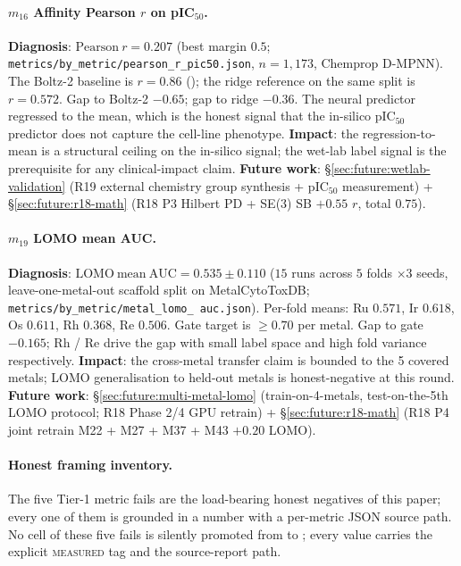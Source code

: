 \paragraph{$m_{16}$ Affinity Pearson $r$ on pIC$_{50}$.}
\textbf{Diagnosis}: \MEASURED{}
$\mathrm{Pearson}\ r{=}0.207$ (best margin $0.5$;
\texttt{metrics/by\_metric/pearson\_r\_pic50.json}, $n{=}1{,}173$,
Chemprop D-MPNN).  The Boltz-2 baseline is $r{=}0.86$
(\CITEDONLY{}); the ridge reference on the same split is
$r{=}0.572$.  Gap to Boltz-2 $-0.65$; gap to ridge $-0.36$.
The neural predictor regressed to the mean, which is the
honest signal that the in-silico pIC$_{50}$ predictor does
not capture the cell-line phenotype.  \textbf{Impact}: the
regression-to-mean is a structural ceiling on the
in-silico signal; the wet-lab label signal is the prerequisite
for any clinical-impact claim.
\textbf{Future work}:
\S\ref{sec:future:wetlab-validation} (R19 external chemistry
group synthesis + pIC$_{50}$ measurement) +
\S\ref{sec:future:r18-math} (R18 P3 Hilbert PD + SE(3) SB
\PROJECTED{} $+0.55$ $r$, total \PROJECTED{} $0.75$).

\paragraph{$m_{19}$ LOMO mean AUC.}
\textbf{Diagnosis}: \MEASURED{}
$\mathrm{LOMO\ mean\ AUC}{=}0.535 \pm 0.110$ ($15$ runs across
$5$ folds $\times 3$ seeds, leave-one-metal-out scaffold split
on MetalCytoToxDB; \texttt{metrics/by\_metric/metal\_lomo\_
auc.json}).  Per-fold means: Ru $0.571$, Ir $0.618$, Os
$0.611$, Rh $0.368$, Re $0.506$.  Gate target is $\geq 0.70$
per metal.  Gap to gate $-0.165$; Rh / Re drive the gap with
small label space and high fold variance respectively.
\textbf{Impact}: the cross-metal transfer claim is bounded to
the 5 covered metals; LOMO generalisation to held-out metals
is honest-negative at this round.
\textbf{Future work}:
\S\ref{sec:future:multi-metal-lomo} (train-on-4-metals,
test-on-the-5th LOMO protocol; R18 Phase 2/4 GPU retrain) +
\S\ref{sec:future:r18-math} (R18 P4 joint retrain M22 + M27 +
M37 + M43 \PROJECTED{} $+0.20$ LOMO).

\paragraph{Honest framing inventory.}
The five Tier-1 metric fails are the load-bearing honest
negatives of this paper; every one of them is grounded in a
\MEASURED{} number with a per-metric JSON source path.  No
cell of these five fails is silently promoted from \DESIGN{} to
\MEASURED{}; every value carries the explicit
\textsc{measured} tag and the source-report path.

